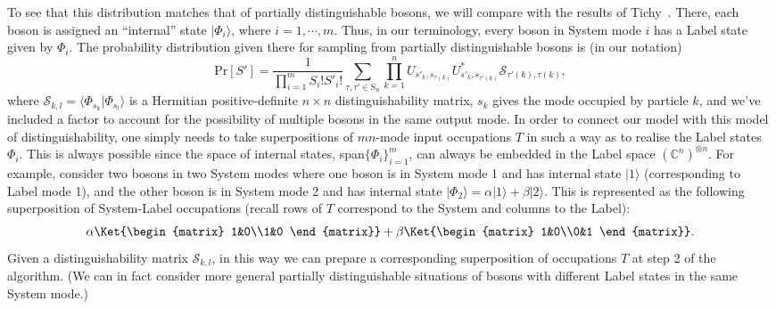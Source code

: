 To see that this distribution matches that of partially distinguishable bosons, we will compare with the results of Tichy~\cite{tichy2015}.
There, each boson is assigned an ``internal'' state $|\Phi_i\rangle$, where $i=1, \cdots, m$.
Thus, in our terminology, every boson in System mode $i$ has a Label state given by $\Phi_i$.
The probability distribution given there for sampling from partially distinguishable bosons is (in our notation)
\begin{equation}\label{eq:nc-TichyDist}
\textrm{Pr}[S'] =  \frac{1}{\prod_{i=1}^m S_i! S'_i!} \sum_{\tau, \tau' \in \textrm{S}_n} \prod_{k=1}^n U_{s'_k,s_{\tau(k)}} U^\ast_{s'_k,s_{{\tau'}(k)}} \mathcal{S}_{{\tau'(k)},{\tau(k)}},
\end{equation}
where $\mathcal{S}_{k,l} = \langle \Phi_{s_k}|\Phi_{s_l}\rangle$ is a Hermitian positive-definite $n \times n$ distinguishability matrix, $s_k$ gives the mode occupied by particle $k$, and we've included a factor to account for the possibility of multiple bosons in the same output mode.
In order to connect our model with this model of distinguishability, one simply needs to take superpositions of $mn$-mode input occupations $T$ in such a way as to realise the Label states $\Phi_i$.
This is always possible since the space of internal states, span$\{\Phi_i\}_{i=1}^m$, can always be embedded in the Label space $(\mathbb{C}^n)^{\otimes n}$.
For example, consider two bosons in two System modes where one boson is in System mode 1 and has internal state $|1\rangle$ (corresponding to Label mode 1), and the other boson is in System mode 2 and has internal state $|\Phi_2\rangle=\alpha|1\rangle+\beta|2\rangle$.
This is represented as the following superposition of System-Label occupations (recall rows of $T$ correspond to the System and columns to the Label):
\begin{align}
\alpha \Ket{\begin{matrix} 1&0\\1&0 \end{matrix}} + \beta \Ket{\begin{matrix} 1&0\\0&1 \end{matrix}} .
\end{align}
Given a distinguishability matrix $\mathcal{S}_{k,l}$, in this way we can prepare a corresponding superposition of occupations $T$ at step 2 of the algorithm.
(We can in fact consider more general partially distinguishable situations of bosons with different Label states in the same System mode.)

